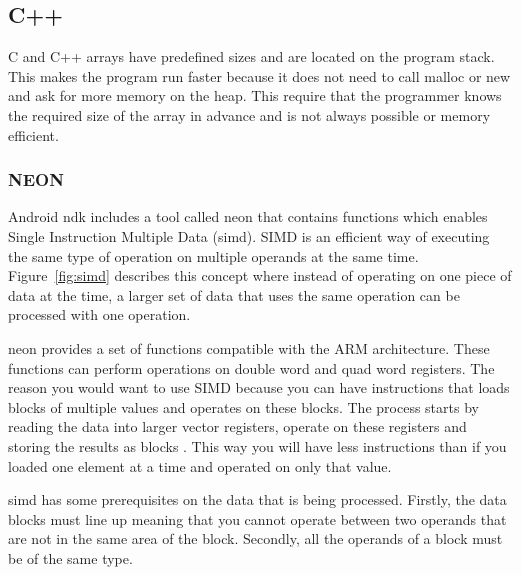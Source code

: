 \subsection{C++}
C and C++ arrays have predefined sizes and are located on the program stack. This makes the program run faster because it does not need to call malloc or new and ask for more memory on the heap. This require that the programmer knows the required size of the array in advance and is not always possible or memory efficient.


\subsubsection{NEON}
Android \gls{ndk} includes a tool called \gls{neon} that contains functions which enables Single Instruction Multiple Data (\gls{simd}). SIMD is an efficient way of executing the same type of operation on multiple operands at the same time. Figure~\ref{fig:simd} describes this concept where instead of operating on one piece of data at the time, a larger set of data that uses the same operation can be processed with one operation.

\gls{neon} provides a set of functions compatible with the ARM architecture. These functions can perform operations on double word and quad word registers. The reason you would want to use SIMD because you can have instructions that loads blocks of multiple values and operates on these blocks.  The process starts by reading the data into larger vector registers, operate on these registers and storing the results as blocks \cite{simd:expl}. This way you will have less instructions than if you loaded one element at a time and operated on only that value.

\gls{simd} has some prerequisites on the data that is being processed. Firstly, the data blocks must line up meaning that you cannot operate between two operands that are not in the same area of the block. Secondly, all the operands of a block must be of the same type.


